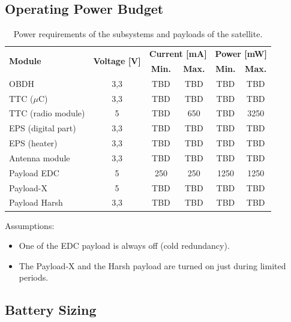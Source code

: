\subsection{Operating Power Budget}

\begin{table}[!h]
    \centering
    \begin{tabular}{lccccc}
        \toprule[1.5pt]
        \multirow{2}{*}{\textbf{Module}} & \multirow{2}{*}{\textbf{Voltage [V]}}    & \multicolumn{2}{c}{\textbf{Current [mA]}} & \multicolumn{2}{c}{\textbf{Power [mW]}} \\
                                         &                                          & \textbf{Min.} & \textbf{Max.}             & \textbf{Min.} & \textbf{Max.} \\
        \midrule
        OBDH                & 3,3   & TBD   & TBD   & TBD   & TBD \\
        TTC ($\mu$C)        & 3,3   & TBD   & TBD   & TBD   & TBD \\
        TTC (radio module)  & 5     & TBD   & 650   & TBD   & 3250 \\
        EPS (digital part)  & 3,3   & TBD   & TBD   & TBD   & TBD \\
        EPS (heater)        & 3,3   & TBD   & TBD   & TBD   & TBD \\
        Antenna module      & 3,3   & TBD   & TBD   & TBD   & TBD \\
        Payload EDC         & 5     & 250   & 250   & 1250  & 1250 \\
        Payload-X           & 5     & TBD   & TBD   & TBD   & TBD \\
        Payload Harsh       & 3,3   & TBD   & TBD   & TBD   & TBD \\
        \bottomrule[1.5pt]
    \end{tabular}
    \caption{Power requirements of the subsystems and payloads of the satellite.}
    \label{tab:power-requirements}
\end{table}

Assumptions:

\begin{itemize}
    \item One of the EDC payload is always off (cold redundancy).
    \item The Payload-X and the Harsh payload are turned on just during limited periods.
\end{itemize}

\subsection{Battery Sizing}

